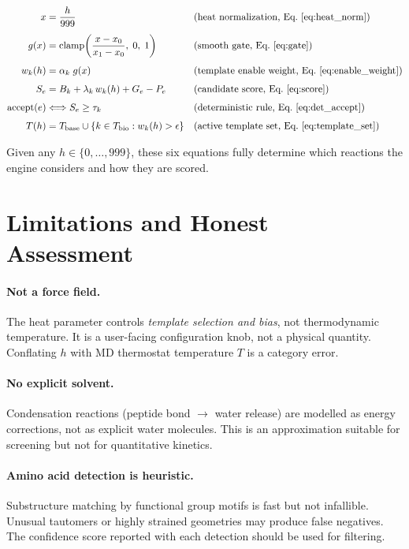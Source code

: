 \documentclass[11pt]{article}
\begin{document}
\begin{align}
x &= \frac{h}{999}
  && \text{(heat normalization, Eq.~\ref{eq:heat_norm})} \\[4pt]
g(x) &= \mathrm{clamp}\!\left(\frac{x - x_0}{x_1 - x_0},\; 0,\; 1\right)
  && \text{(smooth gate, Eq.~\ref{eq:gate})} \\[4pt]
w_k(h) &= \alpha_k\; g(x)
  && \text{(template enable weight, Eq.~\ref{eq:enable_weight})} \\[4pt]
S_e &= B_k + \lambda_k\, w_k(h) + G_e - P_e
  && \text{(candidate score, Eq.~\ref{eq:score})} \\[4pt]
\mathrm{accept}(e) &\Longleftrightarrow S_e \ge \tau_k
  && \text{(deterministic rule, Eq.~\ref{eq:det_accept})} \\[4pt]
T(h) &= T_{\mathrm{base}} \cup
       \{k \in T_{\mathrm{bio}} : w_k(h) > \epsilon\}
  && \text{(active template set, Eq.~\ref{eq:template_set})}
\end{align}

Given any $h \in \{0,\ldots,999\}$, these six equations fully determine
which reactions the engine considers and how they are scored.

\section{Limitations and Honest Assessment}

\paragraph{Not a force field.}
The heat parameter controls \textit{template selection and bias}, not
thermodynamic temperature.  It is a user-facing configuration knob, not a
physical quantity.  Conflating $h$ with MD thermostat temperature $T$ is
a category error.

\paragraph{No explicit solvent.}
Condensation reactions (peptide bond $\to$ water release) are modelled as
energy corrections, not as explicit water molecules.  This is an
approximation suitable for screening but not for quantitative kinetics.

\paragraph{Amino acid detection is heuristic.}
Substructure matching by functional group motifs is fast but not
infallible.  Unusual tautomers or highly strained geometries may produce
false negatives.  The confidence score reported with each detection should
be used for filtering.
\end{document}
